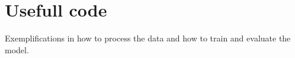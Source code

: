 \chapter{Usefull code}
\hypertarget{md_src_2msecnn__raulkviana_2useful__scripts_2_r_e_a_d_m_e}{}\label{md_src_2msecnn__raulkviana_2useful__scripts_2_r_e_a_d_m_e}
\label{md_src_2msecnn__raulkviana_2useful__scripts_2_r_e_a_d_m_e_autotoc_md27}%
%
Exemplifications in how to process the data and how to train and evaluate the model. 